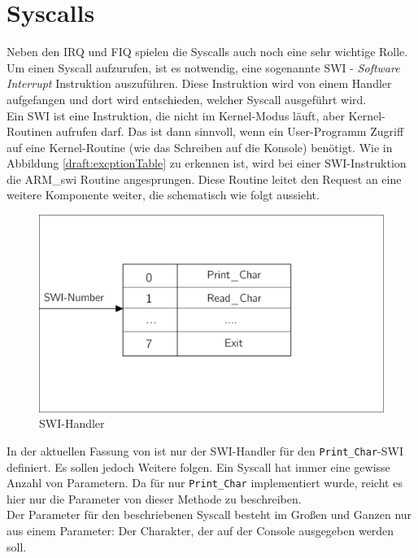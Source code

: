 \section{Syscalls}
Neben den IRQ und FIQ spielen die Syscalls auch noch eine sehr wichtige Rolle. Um einen Syscall aufzurufen, ist es notwendig, eine sogenannte SWI - \textit{Software Interrupt} Instruktion auszuf\"uhren. Diese Instruktion wird von einem Handler aufgefangen und dort wird entschieden, welcher Syscall ausgef\"uhrt wird.\\
Ein SWI ist eine Instruktion, die nicht im Kernel-Modus l\"auft, aber Kernel-Routinen aufrufen darf. Das ist dann sinnvoll, wenn ein User-Programm Zugriff auf eine Kernel-Routine (wie das Schreiben auf die Konsole) ben\"otigt. Wie in Abbildung \ref{draft:excptionTable} zu erkennen ist, wird bei einer SWI-Instruktion die ARM\_swi Routine angesprungen. Diese Routine leitet den Request an eine weitere Komponente weiter, die schematisch wie folgt aussieht.
\begin{figure}[H]
	\begin{center}	
	\caption{SWI-Handler}
	\includegraphics[scale=0.60]{common/swihandler.pdf}
	\end{center}
\end{figure}
\noindent
In der aktuellen Fassung von \mops ist nur der SWI-Handler f\"ur den \texttt{Print\_Char}-SWI definiert. Es sollen jedoch Weitere folgen. Ein Syscall hat immer eine gewisse Anzahl von Parametern. Da f\"ur \mops nur \texttt{Print\_Char} implementiert wurde, reicht es hier nur die Parameter von dieser Methode zu beschreiben.\\ 
Der Parameter f\"ur den beschriebenen Syscall besteht im Gro\ss en und Ganzen nur aus einem Parameter: Der Charakter, der auf der Console ausgegeben werden soll.
\newpage
